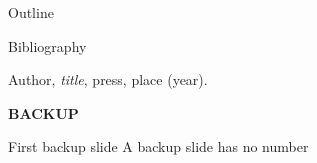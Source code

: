 \documentclass[8pt, xcolor=table]{beamer}
\begin{document}
\parskip=0cm
\justify

\begin{frame}[plain]
  \titlepage
\end{frame}
\parskip=0.2cm

\begin{frame}{Outline}
  \large{
    \parindent=1cm
    \tableofcontents
    \parindent=0cm
  }
\end{frame}




\begin{frame}{Bibliography}
 \begin{thebibliography}{}
  \parskip=3mm
  \bibitem{} Author, {\it title}, press, place (year).
  \end{thebibliography}
\end{frame}

\begin{backupframe}{}
  \centering
  \vspace{0.1cm}
  \textbf{\Huge{BACKUP}}
\end{backupframe}

\begin{backupframe}{First backup slide}
  \centering
  A backup slide has no number
\end{backupframe}
\end{document}
